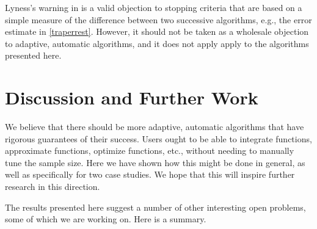 \documentclass[]{elsarticle}
\theoremstyle{definition}
\theoremstyle{remark}
\begin{document}
Lyness's warning in \cite{Lyn83} is a valid objection to stopping criteria that are based on a simple measure of the difference between two successive algorithms, e.g., the error estimate in \eqref{traperrest}. However, it should not be taken as a wholesale objection to adaptive, automatic algorithms, and it does not apply apply to the algorithms presented here.

\section{Discussion and Further Work} \label{furthersec}

We believe that there should be more adaptive, automatic algorithms that have rigorous guarantees of their success.  Users ought to be able to integrate functions, approximate functions, optimize functions, etc., without needing to manually tune the sample size.  Here we have shown how this might be done in general, as well as specifically for two case studies.  We hope that this will inspire further research in this direction.

The results presented here suggest a number of other interesting open problems, some of which we are working on.  Here is a summary.
\end{document}

